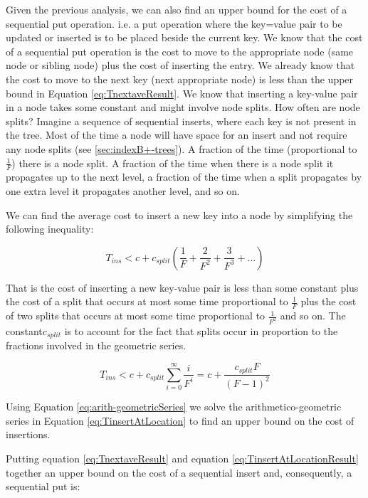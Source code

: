 Given the previous analysis, we can also find an upper bound for the cost of a sequential put operation. i.e. a put operation where the key=value pair to be updated or inserted is to be placed beside the current key. We know that the cost of a sequential put operation is the cost to move to the appropriate node (same node or sibling node) plus the cost of inserting the entry. We already know that the cost to move to the next key (next appropriate node) is less than the upper bound in Equation \ref{eq:TnextaveResult}. We know that inserting a key-value pair in a node takes some constant and might involve node splits. How often are node splits? Imagine a sequence of sequential inserts, where each key is not present in the tree. Most of the time a node will have space for an insert and not require any node splits (see \ref{sec:indexB+-trees}). A fraction of the time (proportional to $\frac{1}{F}$) there is a node split. A fraction of the time when there is a node split it propagates up to the next level, a fraction of the time when a split propagates by one extra level it propagates another level, and so on.  

We can find the average cost to insert a new key into a node by simplifying the following inequality:

\begin{equation} \label{eq:TinsertAtLocation}
    T_{ins} < c + c_{split}(\frac{1}{F} + \frac{2}{F^2} + \frac{3}{F^3} + ...)
\end{equation}

That is the cost of inserting a new key-value pair is less than some constant plus the cost of a split that occurs at most some time proportional to $\frac{1}{F}$ plus the cost of two splits that occurs at most some time proportional to $\frac{1}{F^2}$ and so on. The constant$c_{split}$ is to account for the fact that splits occur in proportion to the fractions involved in the geometric series.

\begin{equation} \label{eq:TinsertAtLocationResult}
    T_{ins} < c + c_{split}\sum_{i=0}^{\infty} \frac{i}{F^i} = c + \frac{c_{split}F}{(F-1)^2} 
\end{equation}

Using Equation \ref{eq:arith-geometricSeries} we solve the arithmetico-geometric series in Equation \ref{eq:TinsertAtLocation} to find an upper bound on the cost of insertions.

Putting equation \ref{eq:TnextaveResult} and equation \ref{eq:TinsertAtLocationResult} together an upper bound on the cost of a sequential insert and, consequently, a sequential put is:

